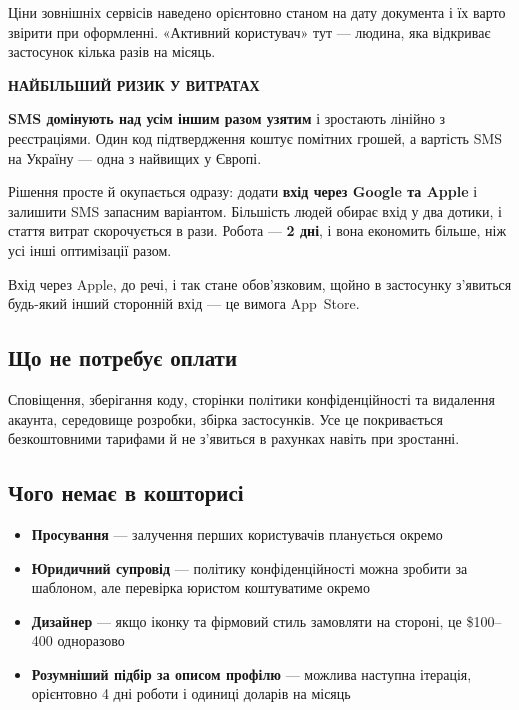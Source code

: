 \documentclass[11pt,a4paper]{article}
\newcommand{\notelbl}[2]{{\color{#1}\footnotesize\bfseries\MakeUppercase{#2}}\par\vspace{3pt}}
\begin{document}
\vspace{4pt}
{\color{muted}\footnotesize Ціни зовнішніх сервісів наведено орієнтовно станом на
дату документа і їх варто звірити при оформленні. «Активний користувач» тут ---
людина, яка відкриває застосунок кілька разів на місяць.}

\vspace{8pt}
\begin{note}
\notelbl{critical}{Найбільший ризик у витратах}
\textbf{SMS домінують над усім іншим разом узятим} і зростають лінійно з
реєстраціями. Один код підтвердження коштує помітних грошей, а вартість SMS
на Україну --- одна з найвищих у Європі.

\vspace{4pt}
Рішення просте й окупається одразу: додати \textbf{вхід через Google та Apple}
і залишити SMS запасним варіантом. Більшість людей обирає вхід у два дотики,
і стаття витрат скорочується в рази. Робота --- \textbf{2 дні}, і вона
економить більше, ніж усі інші оптимізації разом.

\vspace{4pt}
Вхід через Apple, до речі, і так стане обов'язковим, щойно в застосунку
з'явиться будь-який інший сторонній вхід --- це вимога App~Store.
\end{note}

\subsection{Що не потребує оплати}

Сповіщення, зберігання коду, сторінки політики конфіденційності та видалення
акаунта, середовище розробки, збірка застосунків. Усе це покривається
безкоштовними тарифами й не з'явиться в рахунках навіть при зростанні.

\subsection{Чого немає в кошторисі}

\begin{itemize}
  \item \textbf{Просування} --- залучення перших користувачів планується окремо
  \item \textbf{Юридичний супровід} --- політику конфіденційності можна зробити
        за шаблоном, але перевірка юристом коштуватиме окремо
  \item \textbf{Дизайнер} --- якщо іконку та фірмовий стиль замовляти на стороні,
        це \$100--400 одноразово
  \item \textbf{Розумніший підбір за описом профілю} --- можлива наступна
        ітерація, орієнтовно 4 дні роботи і одиниці доларів на місяць
\end{itemize}
\end{document}
